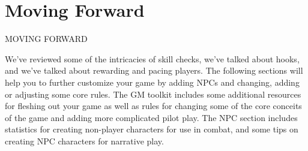 \chapter{Moving Forward}
                                       MOVING FORWARD

We’ve reviewed some of the intricacies of skill checks, we’ve talked about hooks, and we’ve
talked about rewarding and pacing players. The following sections will help you to further
customize your game by adding NPCs and changing, adding or adjusting some core rules.
The GM toolkit includes some additional resources for fleshing out your game as well as rules
for changing some of the core conceits of the game and adding more complicated pilot play. The
NPC section includes statistics for creating non-player characters for use in combat, and some
tips on creating NPC characters for narrative play.

